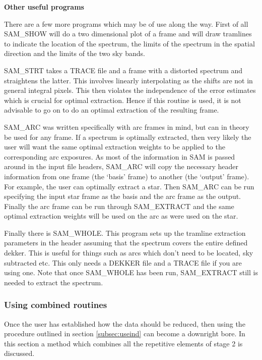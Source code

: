 {\bf Other useful programs}

There are a few more programs which may be of use along the way.  First of all
SAM\_SHOW will do a two dimensional plot of a frame and will draw tramlines
to indicate the location of the spectrum, the limits of the spectrum in the
spatial direction and the limits of the two sky bands.

SAM\_STRT takes a TRACE file and a frame with a distorted spectrum and
straightens the latter.  This involves linearly interpolating as the shifts
are not in general integral pixels.  This then violates the independence of
the error estimates which is crucial for optimal extraction.  Hence if this
routine is used, it is not advisable to go on to do an optimal extraction of
the resulting frame.

SAM\_ARC was written specifically with arc frames in mind, but can in theory
be used for any frame.  If a spectrum is optimally extracted, then very likely
the user will want the same optimal extraction weights to be applied to the
corresponding arc exposures.  As most of the information in SAM is passed
around in the input file headers, SAM\_ARC will copy the necessary header
information from one frame (the `basis' frame) to another (the `output'
frame).  For example, the user can optimally extract a star. Then SAM\_ARC can
be run specifying the input star frame as the basis and the arc frame as the
output.  Finally the arc frame can be run through SAM\_EXTRACT and the same
optimal extraction weights will be used on the arc as were used on the star.

Finally there is SAM\_WHOLE.  This program sets up the tramline extraction
parameters in the header assuming that the spectrum covers the entire defined
dekker.  This is useful for things such as arcs which don't need to be
located, sky subtracted etc.  This only needs a DEKKER file and a TRACE file
if you are using one. Note that once SAM\_WHOLE has been run, SAM\_EXTRACT
still is needed to extract the spectrum.

\subsubsection{Using combined routines}

Once the user has established how the data should be reduced, then using the
procedure outlined in section \ref{subsec:useind} can become a downright bore.
In this section a method which combines all the repetitive elements of stage 2
is discussed.

